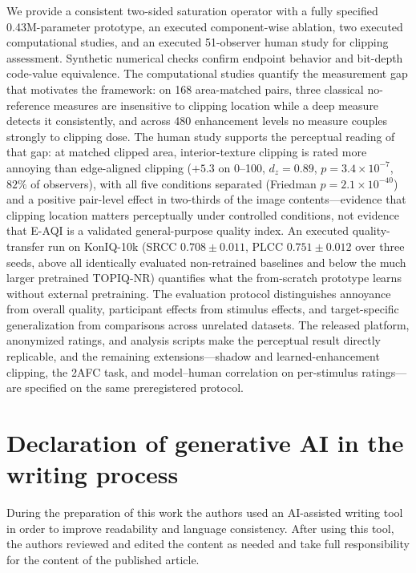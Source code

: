 \documentclass[5p,times,twocolumn]{elsarticle}
\begin{document}
We provide a consistent two-sided saturation operator with a fully specified
0.43M-parameter prototype, an executed component-wise ablation, two executed
computational studies, and an executed 51-observer human study for clipping
assessment. Synthetic numerical checks confirm endpoint behavior and
bit-depth code-value equivalence. The computational studies quantify the
measurement gap that motivates the framework: on 168 area-matched pairs,
three classical no-reference measures are insensitive to clipping location
while a deep measure detects it consistently, and across 480 enhancement
levels no measure couples strongly to clipping dose. The human study
supports the perceptual reading of that gap: at matched clipped area,
interior-texture clipping is rated more annoying than edge-aligned clipping
($+5.3$ on 0--100, $d_z = 0.89$, $p = 3.4 \times 10^{-7}$, $82\%$ of
observers), with all five conditions separated (Friedman
$p = 2.1 \times 10^{-40}$) and a positive pair-level effect in two-thirds of
the image contents---evidence that clipping location matters perceptually
under controlled conditions, not evidence that E-AQI is a validated
general-purpose quality index. An executed quality-transfer run on KonIQ-10k
(SRCC $0.708 \pm 0.011$, PLCC $0.751 \pm 0.012$ over three seeds, above all
identically evaluated non-retrained baselines and below the much larger
pretrained TOPIQ-NR) quantifies what the from-scratch prototype learns
without external pretraining. The evaluation protocol distinguishes annoyance
from overall quality, participant effects from stimulus effects, and
target-specific generalization from comparisons across unrelated datasets.
The released platform, anonymized ratings, and analysis scripts make the
perceptual result directly replicable, and the remaining extensions---shadow
and learned-enhancement clipping, the 2AFC task, and model--human correlation
on per-stimulus ratings---are specified on the same preregistered protocol.

\section*{Declaration of generative AI in the writing process}

During the preparation of this work the authors used an AI-assisted writing
tool in order to improve readability and language consistency. After using
this tool, the authors reviewed and edited the content as needed and take full
responsibility for the content of the published article.
\end{document}
